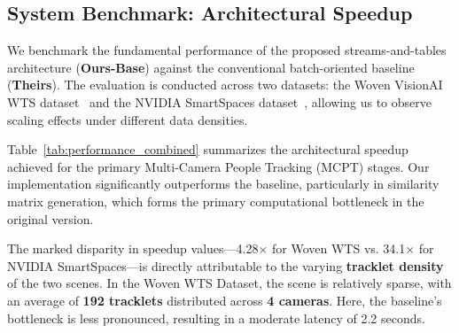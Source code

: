\documentclass[review]{elsarticle}
\begin{document}
\subsection{System Benchmark: Architectural Speedup}

We benchmark the fundamental performance of the proposed streams-and-tables architecture (\textbf{Ours-Base}) against the conventional batch-oriented baseline (\textbf{Theirs}). The evaluation is conducted across two datasets: the Woven VisionAI WTS dataset~\cite{kong2024wts} and the NVIDIA SmartSpaces dataset~\cite{aicity2025track1}, allowing us to observe scaling effects under different data densities.

Table~\ref{tab:performance_combined} summarizes the architectural speedup achieved for the primary Multi-Camera People Tracking (MCPT) stages. Our implementation significantly outperforms the baseline, particularly in similarity matrix generation, which forms the primary computational bottleneck in the original version.

\begin{table}[H]
    \centering
    \caption{Architectural Speedup (\textbf{Theirs} vs. \textbf{Ours-Base}) for Woven WTS and NVIDIA SmartSpaces Datasets (Average Latency per Window over a 50-window stress test).}
    \label{tab:performance_combined}
\end{table}

The marked disparity in speedup values---4.28$\times$ for Woven WTS vs. 34.1$\times$ for NVIDIA SmartSpaces---is directly attributable to the varying \textbf{tracklet density} of the two scenes. In the Woven WTS Dataset, the scene is relatively sparse, with an average of \textbf{192 tracklets} distributed across \textbf{4 cameras}. Here, the baseline's bottleneck is less pronounced, resulting in a moderate latency of 2.2 seconds. 
\end{document}
